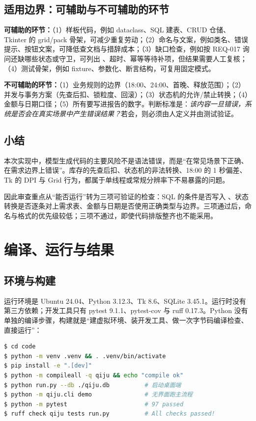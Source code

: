\documentclass[UTF8,a4paper,zihao=-4]{ctexart}
\newcommand{\code}[1]{\texttt{\small\detokenize{#1}}}
\newcommand{\req}[1]{\textsf{\small #1}}
\begin{document}
\subsection{适用边界：可辅助与不可辅助的环节}

\textbf{可辅助的环节：}（1）样板代码，例如 dataclass、SQL 建表、CRUD 仓储、Tkinter 的 grid/pack 骨架，可减少重复劳动；（2）命名与文案，例如类名、错误提示、按钮文案，可降低查文档与措辞成本；（3）缺口检查，例如按 \req{REQ-017} 询问还缺哪些状态或守卫，可列出 \code{NO_SHOW}、超时、幂等等待补项，但结果需要人工复核；（4）测试骨架，例如 fixture、参数化、断言结构，可复用固定模式。

\textbf{不可辅助的环节：}（1）业务规则的边界（18:00、24:00、首晚、释放范围）；（2）并发与事务方案（先查后扣、锁粒度、回滚）；（3）状态机的允许/禁止转换；（4）金额与日期口径；（5）所有要写进报告的数字。判断标准是：\emph{该内容一旦错误，系统是否会在真实场景中产生错误结果？}若会，则必须由人定义并由测试验证。

\subsection{小结}

本次实现中，模型生成代码的主要风险不是语法错误，而是“在常见场景下正确、在需求边界上错误”。库存的先查后扣、状态机的非法转换、18:00 的 1 秒偏差、Tk 的 DPI 与 Grid 行为，都属于单线程或常规分辨率下不易暴露的问题。

因此审查重点从“能否运行”转为三项可验证的检查：SQL 的条件是否写入 \code{WHERE}、状态转换是否逐条对上需求表、金额与日期是否使用正确类型与边界。三项通过后，命名与格式的优先级较低；三项不通过，即使代码排版整齐也不能采用。

\section{编译、运行与结果}

\subsection{环境与构建}

运行环境是 Ubuntu 24.04、Python 3.12.3、Tk 8.6、SQLite 3.45.1。运行时没有第三方依赖；开发工具只有 pytest 9.1.1、pytest-cov 与 ruff 0.17.3。Python 没有单独的编译步骤，构建就是“建虚拟环境、装开发工具、做一次字节码编译检查、直接运行”：

\begin{lstlisting}[language=bash,basicstyle=\ttfamily\footnotesize,frame=single,rulecolor=\color{line},backgroundcolor=\color{paper}]
$ cd code
$ python -m venv .venv && . .venv/bin/activate
$ pip install -e ".[dev]"
$ python -m compileall -q qiju && echo "compile ok"
$ python run.py --db ./qiju.db          # 启动桌面端
$ python -m qiju.cli demo               # 无界面跑主流程
$ python -m pytest                      # 97 passed
$ ruff check qiju tests run.py          # All checks passed!
\end{lstlisting}
\end{document}
